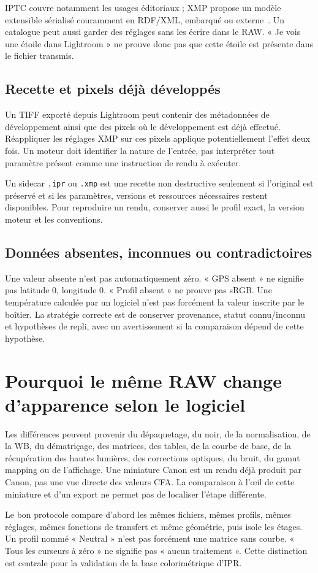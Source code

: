 IPTC couvre notamment les usages éditoriaux ; XMP propose
un modèle extensible sérialisé couramment en RDF/XML,
embarqué ou externe~\cite{xmpimages,iptcimages}. Un catalogue
peut aussi garder des réglages sans les écrire dans le RAW.
« Je vois une étoile dans Lightroom » ne prouve donc pas
que cette étoile est présente dans le fichier transmis.

\subsection{Recette et pixels déjà développés}
Un TIFF exporté depuis Lightroom peut contenir des
métadonnées de développement ainsi que des pixels où le
développement est déjà effectué. Réappliquer les réglages
XMP sur ces pixels applique potentiellement l'effet deux
fois. Un moteur doit identifier la nature de l'entrée,
pas interpréter tout paramètre présent comme une instruction
de rendu à exécuter.

Un sidecar \texttt{.ipr} ou \texttt{.xmp} est une recette
non destructive seulement si l'original est préservé et
si les paramètres, versions et ressources nécessaires
restent disponibles. Pour reproduire un rendu, conserver
aussi le profil exact, la version moteur et les conventions.

\subsection{Données absentes, inconnues ou contradictoires}
Une valeur absente n'est pas automatiquement zéro.
« GPS absent » ne signifie pas latitude 0, longitude 0.
« Profil absent » ne prouve pas sRGB. Une température
calculée par un logiciel n'est pas forcément la valeur
inscrite par le boîtier. La stratégie correcte est de
conserver provenance, statut connu/inconnu et hypothèses
de repli, avec un avertissement si la comparaison dépend
de cette hypothèse.

\section{Pourquoi le même RAW change d'apparence selon le logiciel}
Les différences peuvent provenir du dépaquetage, du noir,
de la normalisation, de la WB, du dématriçage, des matrices,
des tables, de la courbe de base, de la récupération des
hautes lumières, des corrections optiques, du bruit,
du gamut mapping ou de l'affichage. Une miniature Canon
est un rendu déjà produit par Canon, pas une vue directe
des valeurs CFA. La comparaison à l'œil de cette miniature
et d'un export ne permet pas de localiser l'étape différente.

Le bon protocole compare d'abord les mêmes fichiers,
mêmes profils, mêmes réglages, mêmes fonctions de transfert
et même géométrie, puis isole les étages. Un profil nommé
« Neutral » n'est pas forcément une matrice sans courbe.
« Tous les curseurs à zéro » ne signifie pas « aucun
traitement ». Cette distinction est centrale pour la
validation de la base colorimétrique d'IPR.
